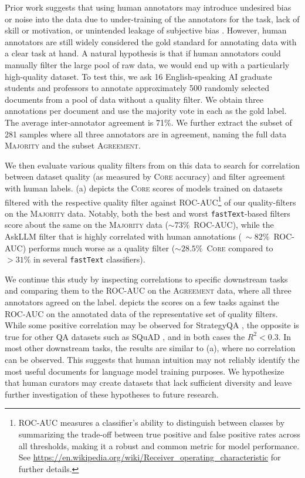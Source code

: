 \documentclass{article}
\newcommand{\fasttext}{\texttt{fastText}\xspace}
\newcommand{\lowvar}{\textsc{Core}\xspace}
\newcommand{\majority}{\textsc{Majority}\xspace}
\newcommand{\agreement}{\textsc{Agreement}\xspace}
\begin{document}
Prior work suggests that using human annotators may introduce undesired bias or noise into the data due to under-training of the annotators for the task, lack of skill or motivation, or unintended leakage of subjective bias \citep{Gillick2010NonExpertEO,Geva2019AreWM,Clark2021AllT}.
However, human annotators are still widely considered the gold standard for annotating data with a clear task at hand.
A natural hypothesis is that if human annotators could manually filter the large pool of raw data, we would end up with a particularly high-quality dataset.
To test this, we ask 16 English-speaking AI graduate students and professors to annotate approximately 500 randomly selected documents from a pool of data without a quality filter.
We obtain three annotations per document and use the majority vote in each as the gold label.
The average inter-annotator agreement is 71\%.
We further extract the subset of 281 samples where all three annotators are in agreement, naming the full data \majority and the subset \agreement.

We then evaluate various quality filters from  on this data to search for correlation between dataset quality (as measured by \lowvar accuracy) and filter agreement with human labels.
 (a) depicts the \lowvar scores of models trained on datasets filtered with the respective quality filter against ROC-AUC\footnote{ROC-AUC measures a classifier's ability to distinguish between classes by summarizing the trade-off between true positive and false positive rates across all thresholds, making it a robust and common metric for model performance. See \url{https://en.wikipedia.org/wiki/Receiver_operating_characteristic} for further details.} of our quality-filters on the \majority data.
Notably, both the best and worst \fasttext-based filters score about the same on the \majority data ($\sim73\%$~ROC-AUC), while the AskLLM filter that is highly correlated with human annotations ($~\sim82\%$~ROC-AUC) performs much worse as a quality filter ($\sim28.5\%$~\lowvar compared to $>31\%$ in several \fasttext classifiers).

We continue this study by inspecting correlations to specific downstream tasks and comparing them to the ROC-AUC on the \agreement data, where all three annotators agreed on the label.
 depicts the scores on a few tasks against the ROC-AUC on the annotated data of the representative set of quality filters.
While some positive correlation may be observed for StrategyQA \citep{Geva2021DidAU}, the opposite is true for other QA datasets such as SQuAD \citep{squad}, and in both cases the $R^2<0.3$.
In most other downstream tasks, the results are similar to  (a), where no correlation can be observed.
This suggests that human intuition may not reliably identify the most useful documents for language model training purposes.
We hypothesize that human curators may create datasets that lack sufficient diversity and leave further investigation of these hypotheses to future research.
\end{document}
